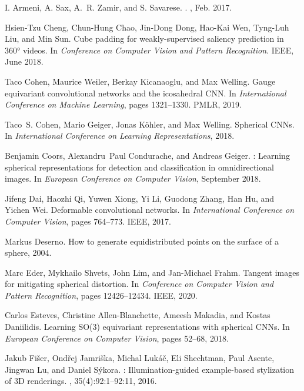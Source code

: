 \documentclass[10pt,twocolumn,letterpaper]{article}
\begin{document}
\begin{thebibliography}{10}\itemsep=-1pt

I. {Armeni}, A. {Sax}, A.~R. {Zamir}, and S. {Savarese}.
.
, Feb. 2017.

Hsien-Tzu Cheng, Chun-Hung Chao, Jin-Dong Dong, Hao-Kai Wen, Tyng-Luh Liu, and
  Min Sun.
\newblock Cube padding for weakly-supervised saliency prediction in 360°
  videos.
\newblock In {\em Conference on Computer Vision and Pattern Recognition}. IEEE,
  June 2018.

Taco Cohen, Maurice Weiler, Berkay Kicanaoglu, and Max Welling.
\newblock Gauge equivariant convolutional networks and the icosahedral {CNN}.
\newblock In {\em International Conference on Machine Learning}, pages
  1321--1330. PMLR, 2019.

Taco~S. Cohen, Mario Geiger, Jonas Köhler, and Max Welling.
\newblock Spherical {CNN}s.
\newblock In {\em International Conference on Learning Representations}, 2018.

Benjamin Coors, Alexandru~Paul Condurache, and Andreas Geiger.
: Learning spherical representations for detection and
  classification in omnidirectional images.
\newblock In {\em European Conference on Computer Vision}, September 2018.

Jifeng Dai, Haozhi Qi, Yuwen Xiong, Yi Li, Guodong Zhang, Han Hu, and Yichen
  Wei.
\newblock Deformable convolutional networks.
\newblock In {\em International Conference on Computer Vision}, pages 764--773.
  IEEE, 2017.

Markus Deserno.
\newblock How to generate equidistributed points on the surface of a sphere,
  2004.

Marc Eder, Mykhailo Shvets, John Lim, and Jan-Michael Frahm.
\newblock Tangent images for mitigating spherical distortion.
\newblock In {\em Conference on Computer Vision and Pattern Recognition}, pages
  12426--12434. IEEE, 2020.

Carlos Esteves, Christine Allen-Blanchette, Ameesh Makadia, and Kostas
  Daniilidis.
\newblock Learning {SO(3)} equivariant representations with spherical {CNN}s.
\newblock In {\em European Conference on Computer Vision}, pages 52--68, 2018.

Jakub Fi\v{s}er, Ond\v{r}ej Jamri\v{s}ka, Michal Luk\'{a}\v{c}, Eli Shechtman,
  Paul Asente, Jingwan Lu, and Daniel S\'{y}kora.
: Illumination-guided example-based stylization of {3D}
  renderings.
, 35(4):92:1--92:11, 2016.


\end{thebibliography}
\end{document}
